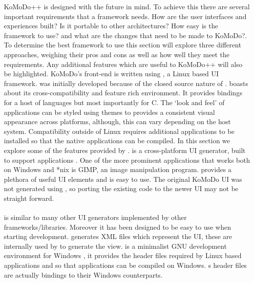 \graphicspath{ {images/research/} }
%
KoMoDo++ is designed with the future in mind. To achieve this there are several important requirements that a framework needs. How are the user interfaces and experiences built? Is it portable to other architectures? How easy is the framework to use? and what are the changes that need to be made to KoMoDo?. To determine the best framework to use this section will explore three different approaches, weighing their pros and cons as well as how well they meet the requirements. Any additional features which are useful to KoMoDo++ will also be highlighted.
%
KoMoDo's front-end is written using , a Linux based UI framework.  was initially developed because of the closed source nature of .  boasts about its cross-compatibility and feature rich environment\cite{gtk}. It provides bindings for a host of languages but most importantly for C. The  `look and feel' of  applications can be styled using themes to provides a consistent visual appearance across platforms, although, this can vary depending on the host system. Compatibility outside of Linux requires additional applications to be installed so that the native  applications can be compiled. In this section we explore some of the features provided by .
   is a cross-platform UI generator, built to support  applications \cite{glade}. One of the more prominent applications that works both on Windows and *nix is GIMP, an image manipulation program.  provides a plethora of useful UI elements and is easy to use. The original KoMoDo UI was not generated using , so porting the existing code to the newer UI may not be straight forward.\\\\
   is similar to many other UI generators implemented by other frameworks/libraries. Moreover it has been designed to be easy to use when starting development.  generates XML files which represent the UI, these are internally used by  to generate the view.
   is a minimalist GNU development environment for Windows \cite{mingw}, it provides the header files required by Linux based applications and  so that applications can be compiled on Windows. s header files are actually bindings to their Windows counterparts.\\\\
